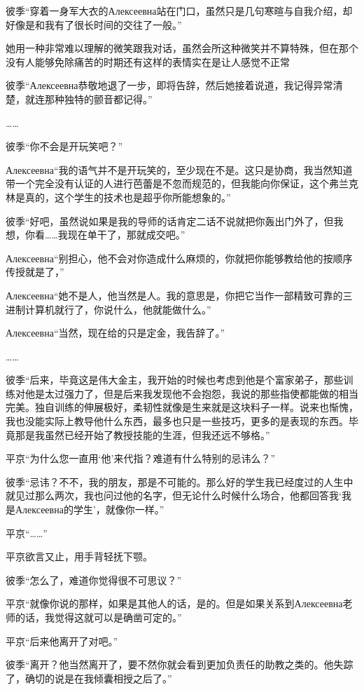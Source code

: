 \documentclass{article}
\begin{document}
彼季“穿着一身军大衣的Алексеевна站在门口，虽然只是几句寒暄与自我介绍，却好像是和我有了很长时间的交往了一般。”

她用一种非常难以理解的微笑跟我对话，虽然会所这种微笑并不算特殊，但在那个没有人能够免除痛苦的时期还有这样的表情实在是让人感觉不正常

彼季“Алексеевна恭敬地退了一步，即将告辞，然后她接着说道，我记得异常清楚，就连那种独特的颤音都记得。”

……

彼季“你不会是开玩笑吧？”

Алексеевна“我的语气并不是开玩笑的，至少现在不是。这只是协商，我当然知道带一个完全没有认证的人进行芭蕾是不忽而规范的，但我能向你保证，这个弗兰克林是真的，这个学生的技术也是超乎你所能想象的。”

彼季“好吧，虽然说如果是我的导师的话肯定二话不说就把你轰出门外了，但我想，你看……我现在单干了，那就成交吧。”

Алексеевна“别担心，他不会对你造成什么麻烦的，你就把你能够教给他的按顺序传授就是了，”

Алексеевна“她不是人，他当然是人。我的意思是，你把它当作一部精致可靠的三进制计算机就行了，你说什么，他就能做什么。”

Алексеевна“当然，现在给的只是定金，我告辞了。”

……

彼季“后来，毕竟这是伟大金主，我开始的时候也考虑到他是个富家弟子，那些训练对他是太过强力了，但是后来我发现他不会抱怨，我说的那些指使都能做的相当完美。独自训练的伸展极好，柔韧性就像是生来就是这块料子一样。说来也惭愧，我也没能实际上教导他什么东西，最多也只是一些技巧，更多的是表现的东西。毕竟那是我虽然已经开始了教授技能的生涯，但我还远不够格。”

平京“为什么您一直用‘他’来代指？难道有什么特别的忌讳么？”

彼季“忌讳？不不，我的朋友，那是不可能的。那么好的学生我已经度过的人生中就见过那么两次，我也问过他的名字，但无论什么时候什么场合，他都回答我‘我是Алексеевна的学生’，就像你一样。”

平京“……”

平京欲言又止，用手背轻抚下颚。

彼季“怎么了，难道你觉得很不可思议？”

平京“就像你说的那样，如果是其他人的话，是的。但是如果关系到Алексеевна老师的话，我觉得这就可以是确凿可定的。”

平京“后来他离开了对吧。”

彼季“离开？他当然离开了，要不然你就会看到更加负责任的助教之类的。他失踪了，确切的说是在我倾囊相授之后了。”
\end{document}
